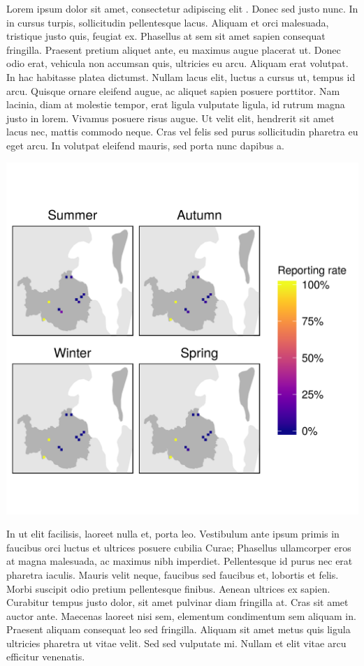 \documentclass[12pt,openany,oneside]{book}
\theoremstyle{definition}
\theoremstyle{definition}
\theoremstyle{definition}
\theoremstyle{remark}
\begin{document}
Lorem ipsum dolor sit amet, consectetur adipiscing elit
\citep{rexample1, rexample2, rexample3}. Donec sed justo nunc. In in
cursus turpis, sollicitudin pellentesque lacus. Aliquam et orci
malesuada, tristique justo quis, feugiat ex. Phasellus at sem sit amet
sapien consequat fringilla. Praesent pretium aliquet ante, eu maximus
augue placerat ut. Donec odio erat, vehicula non accumsan quis,
ultricies eu arcu. Aliquam erat volutpat. In hac habitasse platea
dictumst. Nullam lacus elit, luctus a cursus ut, tempus id arcu. Quisque
ornare eleifend augue, ac aliquet sapien posuere porttitor. Nam lacinia,
diam at molestie tempor, erat ligula vulputate ligula, id rutrum magna
justo in lorem. Vivamus posuere risus augue. Ut velit elit, hendrerit
sit amet lacus nec, mattis commodo neque. Cras vel felis sed purus
sollicitudin pharetra eu eget arcu. In volutpat eleifend mauris, sed
porta nunc dapibus a.

\includegraphics{assets/maps/Dendrocygna-eytoni.png}

In ut elit facilisis, laoreet nulla et, porta leo. Vestibulum ante ipsum
primis in faucibus orci luctus et ultrices posuere cubilia Curae;
Phasellus ullamcorper eros at magna malesuada, ac maximus nibh
imperdiet. Pellentesque id purus nec erat pharetra iaculis. Mauris velit
neque, faucibus sed faucibus et, lobortis et felis. Morbi suscipit odio
pretium pellentesque finibus. Aenean ultrices ex sapien. Curabitur
tempus justo dolor, sit amet pulvinar diam fringilla at. Cras sit amet
auctor ante. Maecenas laoreet nisi sem, elementum condimentum sem
aliquam in. Praesent aliquam consequat leo sed fringilla. Aliquam sit
amet metus quis ligula ultricies pharetra ut vitae velit. Sed sed
vulputate mi. Nullam et elit vitae arcu efficitur venenatis.
\end{document}
